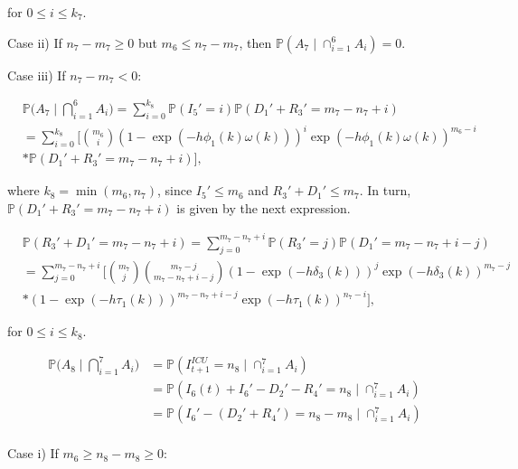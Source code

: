 \documentclass[a4paper]{article}
\theoremstyle{remark}
\begin{document}
for $0\leq i\leq k_7$. 

\medskip
Case ii) If $n_7-m_7\geq 0$ but $m_6\leq n_7-m_7$, then $\mathbb{P}(A_{7}\mid \cap_{i=1}^{6}A_{i})=0$.

\medskip
Case iii) If $n_7-m_7< 0$:

\begin{equation*}
\begin{split}
&\mathbb{P}\bigg(A_{7}\mid \bigcap_{i=1}^{6}A_{i}\bigg)=\sum_{i=0}^{k_8} \mathbb{P}(I_{5}'=i)\mathbb{P}(D_{1}'+R_{3}'=m_7-n_7+i)\\
&=\sum_{i=0}^{k_8} \Bigg[{m_6 \choose i}(1-\exp(-h\phi_1(k)\omega(k)))^{i}\exp(-h\phi_1(k)\omega(k))^{m_6-i}\\
&*\mathbb{P}(D_{1}'+R_{3}'=m_7-n_7+i)\Bigg],
\end{split}
\end{equation*}

where $k_8=\min(m_6,n_7)$, since $I_{5}'\leq m_6$ and $R_{3}'+D_{1}'\leq m_7$. In turn, $\mathbb{P}(D_{1}'+R_{3}'=m_7-n_7+i)$ is given by the next expression.

\begin{equation*}
\begin{split}
&\mathbb{P}(R_{3}'+D_{1}'=m_7-n_7+i)=\sum_{j=0}^{m_7-n_7+i} \mathbb{P}(R_{3}'=j)\mathbb{P}(D_{1}'=m_7-n_7+i-j)\\
&=\sum_{j=0}^{m_7-n_7+i}\Bigg[{m_7 \choose j}{m_7-j \choose m_7-n_7+i-j}(1-\exp(-h\delta_3(k)))^{j}\exp(-h\delta_3(k))^{m_7-j}\\
&*(1-\exp(-h\tau_1(k)))^{m_7-n_7+i-j}\exp(-h\tau_1(k))^{n_7-i}\Bigg],
\end{split}
\end{equation*}

for $0\leq i\leq k_8$. 


\begin{align*}
   \mathbb{P}\bigg(A_{8}\mid \bigcap_{i=1}^{7}A_{i}\bigg)&=\mathbb{P}(I_{t+1}^{ICU} = n_8 \mid \cap_{i=1}^{7}A_{i}) \\
   &= \mathbb{P}(I_6(t)+I_{6}'-D_{2}'-R_{4}'=n_8\mid \cap_{i=1}^{7}A_{i})\\
   &= \mathbb{P}(I_{6}'-(D_{2}'+R_{4}')=n_8-m_8\mid \cap_{i=1}^{7}A_{i})\\
\end{align*}


Case i) If $m_6\geq n_8-m_8\geq 0$:
\end{document}
